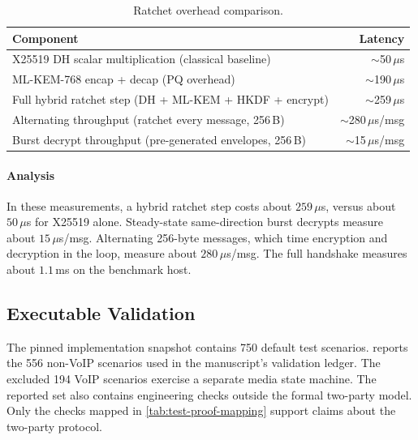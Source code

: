 \documentclass[preprint,12pt]{elsarticle}
\theoremstyle{definition}
\begin{document}
\begin{table}[H]
\centering
\caption{Ratchet overhead comparison.}\label{tab:bench-overhead}
\small
\begin{tabular}{@{}lr@{}}
\toprule
Component & Latency \\
\midrule
X25519 DH scalar multiplication (classical baseline) & $\sim$50\,$\mu$s \\
ML-KEM-768 encap + decap (PQ overhead) & $\sim$190\,$\mu$s \\
Full hybrid ratchet step (DH + ML-KEM + HKDF + encrypt) & $\sim$259\,$\mu$s \\
\midrule
Alternating throughput (ratchet every message, 256\,B) & $\sim$280\,$\mu$s/msg \\
Burst decrypt throughput (pre-generated envelopes, 256\,B) & $\sim$15\,$\mu$s/msg \\
\bottomrule
\end{tabular}
\end{table}

\paragraph{Analysis}
In these measurements, a hybrid ratchet step costs about $259\,\mu$s, versus about $50\,\mu$s for X25519 alone. Steady-state same-direction burst decrypts measure about $15\,\mu$s/msg. Alternating 256-byte messages, which time encryption and decryption in the loop, measure about $280\,\mu$s/msg. The full handshake measures about $1.1$\,ms on the benchmark host.

\subsection{Executable Validation}\label{sec:tests}

The pinned implementation snapshot contains 750 default test scenarios.
 reports the 556 non-VoIP scenarios used in the manuscript's
validation ledger. The excluded 194 VoIP scenarios exercise a separate media
state machine. The reported set also contains engineering checks outside the
formal two-party model. Only the checks mapped in \cref{tab:test-proof-mapping}
support claims about the two-party protocol.
\end{document}
